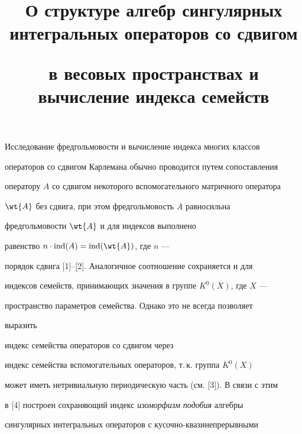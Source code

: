 

\title{О структуре алгебр сингулярных интегральных операторов со сдвигом


в весовых пространствах и вычисление индекса семейств}





\date{}




\pagestyle{plain} %







\maketitle


\label{begin}





Исследование фредгольмовости и вычисление индекса многих классов


операторов со сдвигом Карлемана обычно проводится путем сопоставления


оператору $A$ со сдвигом некоторого вспомогательного матричного оператора


$\wt{A}$ без сдвига, при этом фредгольмовость $A$ равносильна


фредгольмовости $\wt{A}$ и для индексов выполнено


равенство $n\cdot \ind (A)=\ind(\wt{A})$, где $n$ ---


порядок сдвига [1]--[2]. Аналогичное соотношение сохраняется и для


индексов семейств, принимающих значения в группе $K^0(X)$, где $X$ ---


пространство параметров семейства. Однако это не всегда позволяет


выразить


индекс семейства операторов со сдвигом через


индекс семейства вспомогательных операторов, т.\,к. группа $K^0(X)$


может иметь нетривиальную периодическую часть (см. [3]). В связи с этим


в [4] построен сохраняющий индекс {\it изоморфизм подобия} алгебры


сингулярных интегральных операторов с кусочно-квазинепрерывными


